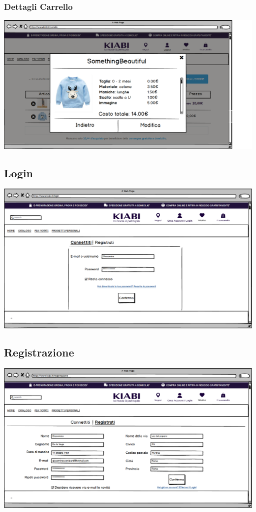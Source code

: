 \documentclass[12pt,italian,]{report}
\begin{document}
\subsubsection{Dettagli Carrello} 
\includegraphics{balsamiq/Carrello dettagli.png}


\subsection{Login} 
\includegraphics{balsamiq/Login.png}

\subsection{Registrazione} 
\includegraphics{balsamiq/Registrazione.png}
\end{document}
